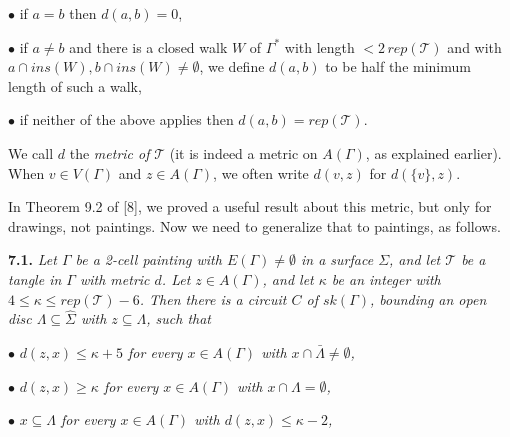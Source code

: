 \hspace*{12pt}$\bullet$ if $a = b$ then $d(a, b) = 0$,

\hspace*{12pt}$\bullet$ if $a\ne b$ and there is a closed walk $W$ of $\Gamma^*$ with length $<2\,rep(\mathscr{T})$ and with $a\cap ins(W), b\cap ins(W)\ne \emptyset$, we define $d(a, b)$ to be half the minimum length of such a walk,

\hspace*{12pt}$\bullet$ if neither of the above applies then $d(a, b) = rep(\mathscr{T})$.

We call $d$ the \textit{metric of} $\mathscr{T}$ (it is indeed a metric on $A(\Gamma)$, as explained earlier). When $v\in V(\Gamma)$ and $z\in A(\Gamma)$, we often write $d(v, z)$ for $d(\{v\}, z)$.

In Theorem 9.2 of [8], we proved a useful result about this metric, but only for drawings, not paintings. Now we need to generalize that to paintings, as follows.

\textbf{7.1.} \textit{Let $\Gamma$ be a 2-cell painting with $E(\Gamma)\ne \emptyset$ in a surface $\Sigma$, and let $\mathscr{T}$ be a tangle in $\Gamma$ with metric $d$. Let $z\in A(\Gamma)$, and let $\kappa$ be an integer with $4\le \kappa\le rep(\mathscr{T}) - 6$. Then there is a circuit $C$ of $sk(\Gamma)$, bounding an open disc $\Lambda\subseteq \hat{\Sigma}$ with $z\subseteq \Lambda$, such that}

\hspace*{12pt}$\bullet$ \textit{$d(z, x)\le \kappa + 5$ for every $x\in A(\Gamma)$ with $x\cap \bar{\Lambda}\ne \emptyset$,}

\hspace*{12pt}$\bullet$ \textit{$d(z, x)\ge \kappa$ for every $x\in A(\Gamma)$ with $x\cap \Lambda = \emptyset$,}

\hspace*{12pt}$\bullet$ \textit{$x\subseteq \Lambda$ for every $x\in A(\Gamma)$ with $d(z, x)\le \kappa - 2$,}
